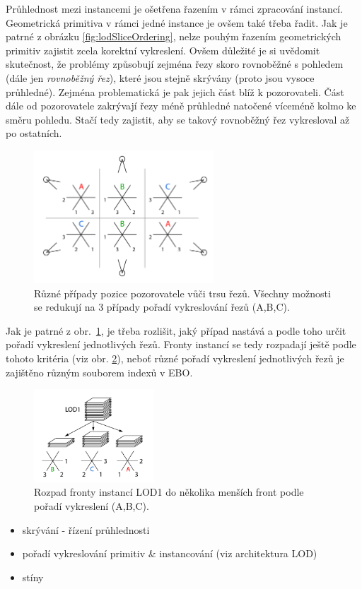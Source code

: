 Průhlednost mezi instancemi je ošetřena řazením v rámci zpracování instancí. Geometrická primitiva v rámci jedné instance je ovšem také třeba řadit. Jak je patrné z obrázku \ref{fig:lodSliceOrdering}, nelze pouhým řazením geometrických primitiv zajistit zcela korektní vykreslení. Ovšem důležité je si uvědomit skutečnost, že problémy způsobují zejména řezy skoro rovnoběžné s pohledem (dále jen \emph{rovnoběžný řez}), které jsou stejně skrývány (proto jsou vysoce průhledné). Zejména problematická je pak jejich část blíž k pozorovateli. Část dále od pozorovatele zakrývají řezy méně průhledné natočené víceméně kolmo ke směru pohledu. Stačí tedy zajistit, aby se takový rovnoběžný řez vykresloval až po ostatních.
\begin{figure}[!hbt]
\begin{center}
\includegraphics[width=0.6\textwidth]{./figures/LODtypes.png}
\end{center}
\caption[Variace pořadí vykreslování trsu řezů]%
{Různé případy pozice pozorovatele vůči trsu řezů. Všechny možnosti se redukují na 3 případy pořadí vykreslování řezů (A,B,C).
\label{fig:LODtypes}
}
\end{figure}
Jak je patrné z obr.~\ref{fig:LODtypes}, je třeba rozlišit, jaký případ nastává a podle toho určit pořadí vykreslení jednotlivých řezů. Fronty instancí se tedy rozpadají ještě podle tohoto kritéria (viz obr. \ref{fig:LODqueues}), neboť různé pořadí vykreslení jednotlivých řezů je zajištěno různým souborem indexů v EBO.
\begin{figure}[!hbt]
\begin{center}
\includegraphics[width=0.4\textwidth]{./figures/renderQueuesB.png}
\end{center}
\caption[Pořadí vykreslování LOD1]%
{Rozpad fronty instancí LOD1 do několika menších front podle pořadí vykreslení (A,B,C).
\label{fig:LODqueues}
}
\end{figure}



\begin{itemize}
\item skrývání - řízení průhlednosti
\item pořadí vykreslování primitiv \& instancování (viz architektura LOD)
\item stíny
\end{itemize}